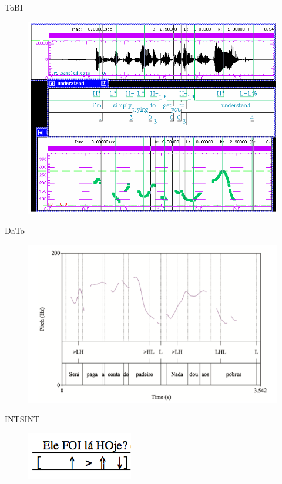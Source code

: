 \documentclass{beamer}
\begin{document}
\begin{frame}{ToBI}
    \begin{figure}
      \includegraphics[scale=0.40]{tobi.png}
    \end{figure}
\end{frame}

\begin{frame}{DaTo}
    \begin{figure}
      \includegraphics[scale=0.40]{dato.png}
    \end{figure}
\end{frame}

\begin{frame}{INTSINT}
    \begin{figure}
      \includegraphics[scale=0.80]{intsint.png}
    \end{figure}
\end{frame}
\end{document}
